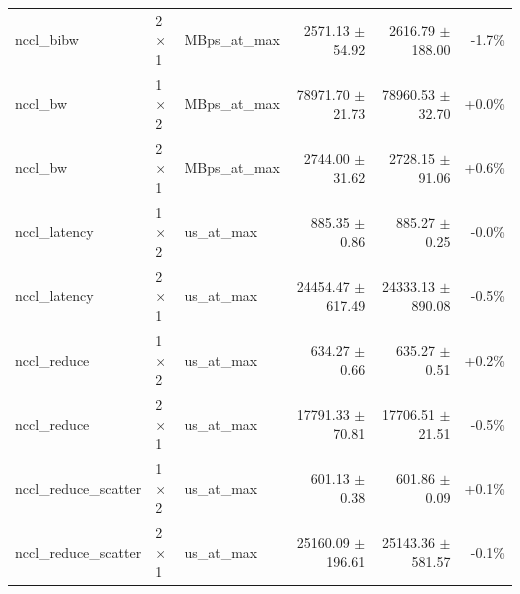 \begin{tabular}{lllrrr}
nccl\_bibw & 2$\times$1 & MBps\_at\_max & 2571.13 $\pm$ 54.92 & 2616.79 $\pm$ 188.00 & -1.7\% \\
nccl\_bw & 1$\times$2 & MBps\_at\_max & 78971.70 $\pm$ 21.73 & 78960.53 $\pm$ 32.70 & +0.0\% \\
nccl\_bw & 2$\times$1 & MBps\_at\_max & 2744.00 $\pm$ 31.62 & 2728.15 $\pm$ 91.06 & +0.6\% \\
nccl\_latency & 1$\times$2 & us\_at\_max & 885.35 $\pm$ 0.86 & 885.27 $\pm$ 0.25 & -0.0\% \\
nccl\_latency & 2$\times$1 & us\_at\_max & 24454.47 $\pm$ 617.49 & 24333.13 $\pm$ 890.08 & -0.5\% \\
nccl\_reduce & 1$\times$2 & us\_at\_max & 634.27 $\pm$ 0.66 & 635.27 $\pm$ 0.51 & +0.2\% \\
nccl\_reduce & 2$\times$1 & us\_at\_max & 17791.33 $\pm$ 70.81 & 17706.51 $\pm$ 21.51 & -0.5\% \\
nccl\_reduce\_scatter & 1$\times$2 & us\_at\_max & 601.13 $\pm$ 0.38 & 601.86 $\pm$ 0.09 & +0.1\% \\
nccl\_reduce\_scatter & 2$\times$1 & us\_at\_max & 25160.09 $\pm$ 196.61 & 25143.36 $\pm$ 581.57 & -0.1\% \\
\bottomrule
\end{tabular}

